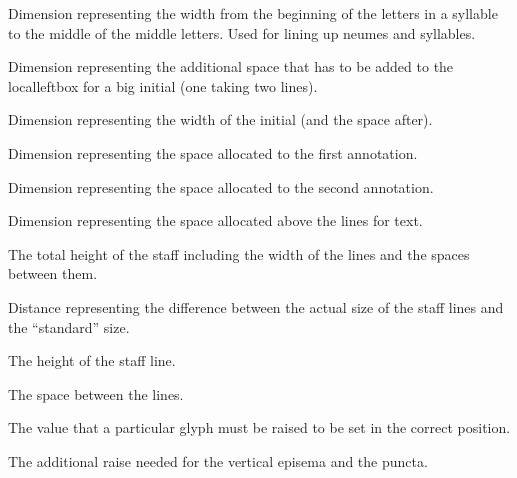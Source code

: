 Dimension representing the width from the beginning of the letters in
a syllable to the middle of the middle letters.  Used for lining up
neumes and syllables.

Dimension representing the additional space that has to be added to
the localleftbox for a big initial (one taking two lines).

Dimension representing the width of the initial (and the space after).

Dimension representing the space allocated to the first annotation.

Dimension representing the space allocated to the second annotation.

Dimension representing the space allocated above the lines for text.	

The total height of the staff including the width of the lines and the spaces between them.

Distance representing the difference between the actual size of the staff lines and the ``standard'' size.

The height of the staff line.

The space between the lines.

The value that a particular glyph must be raised to be set in the correct position.

The additional raise needed for the vertical episema and the puncta.

